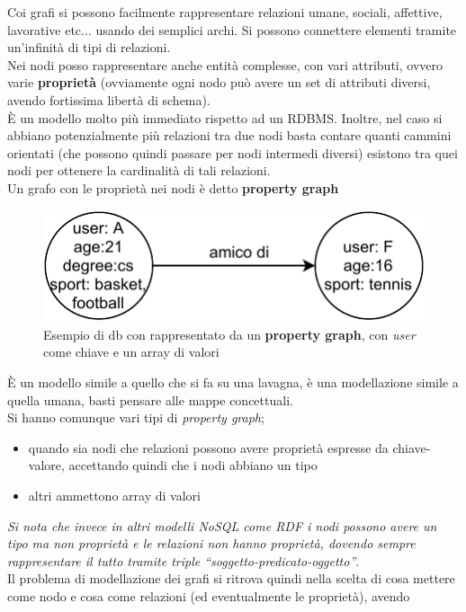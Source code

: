 \documentclass[a4paper,12pt, oneside]{book}
\begin{document}
Coi grafi si possono facilmente rappresentare relazioni umane, sociali,
affettive, lavorative etc$\ldots$ usando dei semplici archi. Si possono
connettere elementi tramite un'infinità di tipi di relazioni.\\
Nei nodi posso rappresentare anche entità complesse, con vari attributi, ovvero
varie \textbf{proprietà} (ovviamente ogni nodo può avere un set di attributi
diversi, avendo fortissima libertà di schema).\\
È un modello molto più immediato rispetto ad un RDBMS. Inoltre, nel caso si
abbiano potenzialmente più relazioni tra due nodi basta contare quanti cammini
orientati (che possono quindi passare per nodi intermedi diversi) esistono tra
quei nodi per ottenere la cardinalità di tali relazioni. \\
Un grafo con le proprietà nei nodi è detto \textbf{property graph}
\begin{figure}
  \centering
  \includegraphics[scale = 1]{img/gdb2.pdf}
  \caption{Esempio di db con rappresentato da un \textbf{property graph}, con
    \textit{user} come chiave e un array di valori}
  \label{fig:gdb2}
\end{figure}
È un modello simile a quello che si fa su una lavagna, è una modellazione simile
a quella umana, basti pensare alle mappe concettuali. \\
Si hanno comunque vari tipi di \textit{property graph};
\begin{itemize}
  \item quando sia nodi che relazioni possono avere proprietà espresse da
  chiave-valore, accettando quindi che i nodi abbiano un tipo
  \item altri ammettono array di valori
\end{itemize}
\textit{Si nota che invece in altri modelli NoSQL come RDF i nodi possono avere
  un tipo ma non proprietà e le relazioni non hanno proprietà, dovendo sempre
  rappresentare il tutto tramite triple ``soggetto-predicato-oggetto''}.\\
Il problema di modellazione dei grafi si ritrova quindi nella scelta di cosa
mettere come nodo e cosa come relazioni (ed eventualmente le proprietà), avendo
\end{document}
